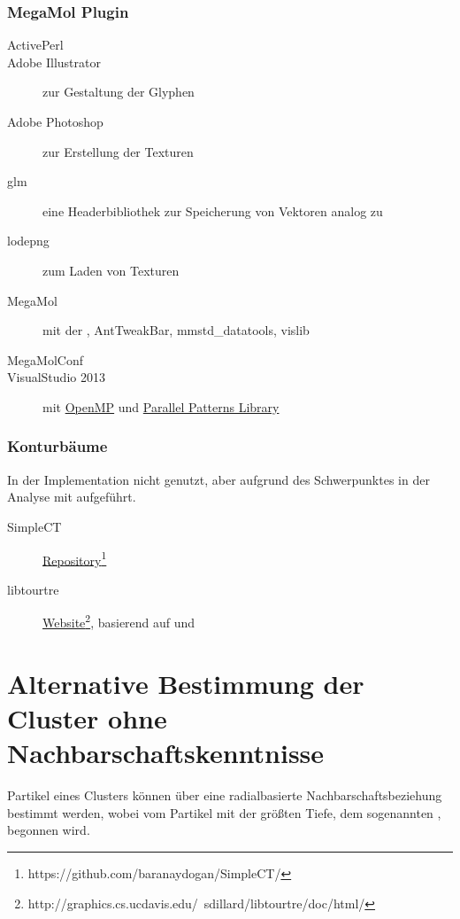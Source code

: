 \subsubsection{MegaMol Plugin}
\begin{description}
	\item [ActivePerl]
	\item [Adobe Illustrator] zur Gestaltung der Glyphen
	\item [Adobe Photoshop] zur Erstellung der Texturen
	\item [\gls{glm}] eine Headerbibliothek zur Speicherung von Vektoren analog zu \OGL
	\item [lodepng] zum Laden von Texturen
	\item [MegaMol] mit der \ANN, AntTweakBar, mmstd\_datatools, vislib
	\item [MegaMolConf]
	\item [VisualStudio 2013] mit \href{http://openmp.org/}{OpenMP} und \href{https://msdn.microsoft.com/en-us/library/dd492418.aspx}{Parallel Patterns Library}
\end{description}

\subsubsection{Konturbäume}
In der Implementation nicht genutzt, aber aufgrund des Schwerpunktes in der Analyse mit aufgeführt.
\begin{description}
	\item [SimpleCT]  \href{https://github.com/baranaydogan/SimpleCT/}{Repository}\footnote{https://github.com/baranaydogan/SimpleCT/} \cite{aydogan2013contourTreeBinary}
	\item [libtourtre] \href{http://graphics.cs.ucdavis.edu/~sdillard/libtourtre/doc/html/}{Website}\footnote{http://graphics.cs.ucdavis.edu/~sdillard/libtourtre/doc/html/}, basierend auf \cite{carr2001computingCountourTrees} und \cite{pascucci2004multiResolutionComputation}
\end{description}

\section{Alternative Bestimmung der Cluster ohne Nachbarschaftskenntnisse}\label{sec:cluster-radial}
Partikel eines Clusters können über eine radialbasierte Nachbarschaftsbeziehung bestimmt werden, wobei vom Partikel mit der größten Tiefe, dem sogenannten , begonnen wird.

